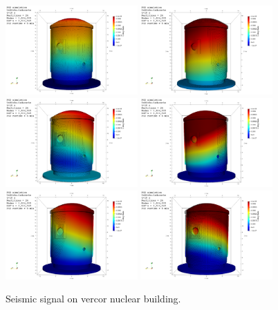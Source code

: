 \begin{figure}
	\centering
	\includegraphics[width=0.45\textwidth]{./Images/vercor0000.png}        
	\includegraphics[width=0.45\textwidth]{./Images/vercor0111.png}\\    
	\includegraphics[width=0.45\textwidth]{./Images/vercor0119.png}
	\includegraphics[width=0.45\textwidth]{./Images/vercor134.png}\\        
\includegraphics[width=0.45\textwidth]{./Images/vercor138.png}    
\includegraphics[width=0.45\textwidth]{./Images/vercor140.png}	
	\caption{Seismic signal on vercor nuclear building.}
	\label{fig:vercor-sesimic}
\end{figure}

